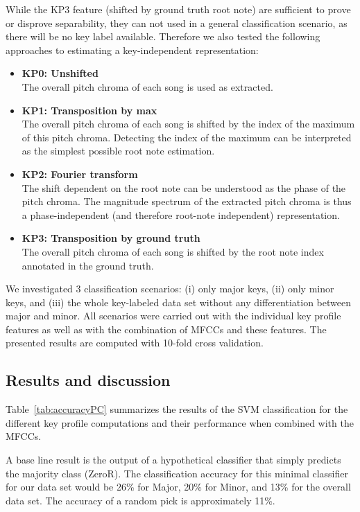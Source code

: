 \documentclass{article}
\begin{document}
While the KP3 feature (shifted by ground truth root note) are sufficient to prove or disprove separability, they can not used in a general classification scenario, as there will be no key label available. Therefore we also tested the following approaches to estimating a key-independent representation:
\begin{itemize}
    \item   \textbf{KP0: Unshifted}\\
        The overall pitch chroma of each song is used as extracted.
    \item   \textbf{KP1: Transposition by max}\\
        The overall pitch chroma of each song is shifted by the index of the maximum of this pitch chroma. Detecting the index of the maximum can be interpreted as the simplest possible root note estimation.
    \item   \textbf{KP2: Fourier transform}\\
        The shift dependent on the root note can be understood as the phase of the pitch chroma. The magnitude spectrum of the extracted pitch chroma is thus a phase-independent (and therefore root-note independent) representation. %
    \item   \textbf{KP3: Transposition by ground truth}\\
        The overall pitch chroma of each song is shifted by the root note index annotated in the ground truth.
\end{itemize}

We investigated 3 classification scenarios: (i) only major keys, (ii) only minor keys, and (iii) the whole key-labeled data set without any differentiation between major and minor. All scenarios were carried out with the individual key profile features as well as with the combination of MFCCs and these features. The presented results are computed with 10-fold cross validation.

\subsection{Results and discussion}
Table~\ref{tab:accuracyPC} summarizes the results of the SVM classification for the different key profile computations and their performance when combined with the MFCCs. 

A base line result is the output of a hypothetical classifier that simply predicts the majority class (ZeroR). The classification accuracy for this minimal classifier for our data set would be 26\% for Major, 20\% for Minor, and 13\% for the overall data set. The accuracy of a random pick is approximately 11\%.
\end{document}
